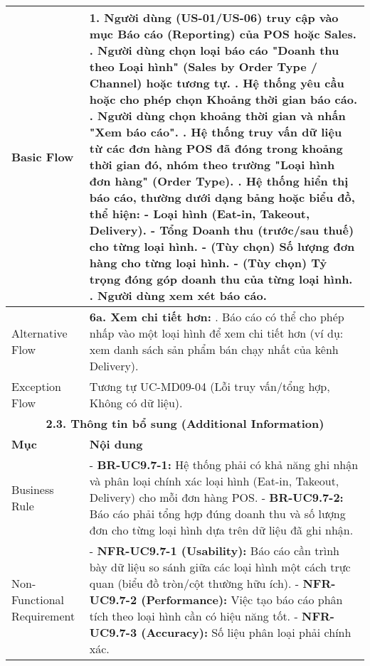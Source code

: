 \begin{longtable}{|m{4cm}|p{11cm}|}
\hline
Basic Flow & 1. Người dùng (US-01/US-06) truy cập vào mục Báo cáo (Reporting) của POS hoặc Sales. \newline 2. Người dùng chọn loại báo cáo "Doanh thu theo Loại hình" (Sales by Order Type / Channel) hoặc tương tự. \newline 3. Hệ thống yêu cầu hoặc cho phép chọn Khoảng thời gian báo cáo. \newline 4. Người dùng chọn khoảng thời gian và nhấn "Xem báo cáo". \newline 5. Hệ thống truy vấn dữ liệu từ các đơn hàng POS đã đóng trong khoảng thời gian đó, nhóm theo trường "Loại hình đơn hàng" (Order Type). \newline 6. Hệ thống hiển thị báo cáo, thường dưới dạng bảng hoặc biểu đồ, thể hiện: \newline    - Loại hình (Eat-in, Takeout, Delivery). \newline    - Tổng Doanh thu (trước/sau thuế) cho từng loại hình. \newline    - (Tùy chọn) Số lượng đơn hàng cho từng loại hình. \newline    - (Tùy chọn) Tỷ trọng đóng góp doanh thu của từng loại hình. \newline 7. Người dùng xem xét báo cáo. \\
\hline
Alternative Flow & \textbf{6a. Xem chi tiết hơn:} \newline    1. Báo cáo có thể cho phép nhấp vào một loại hình để xem chi tiết hơn (ví dụ: xem danh sách sản phẩm bán chạy nhất của kênh Delivery). \\
\hline
Exception Flow & Tương tự UC-MD09-04 (Lỗi truy vấn/tổng hợp, Không có dữ liệu). \\
\hline
\multicolumn{2}{|c|}{\textbf{2.3. Thông tin bổ sung (Additional Information)}} \\
\hline
\textbf{Mục} & \textbf{Nội dung} \\
\hline
Business Rule & - \textbf{BR-UC9.7-1:} Hệ thống phải có khả năng ghi nhận và phân loại chính xác loại hình (Eat-in, Takeout, Delivery) cho mỗi đơn hàng POS. \newline - \textbf{BR-UC9.7-2:} Báo cáo phải tổng hợp đúng doanh thu và số lượng đơn cho từng loại hình dựa trên dữ liệu đã ghi nhận. \\
\hline
Non-Functional Requirement & - \textbf{NFR-UC9.7-1 (Usability):} Báo cáo cần trình bày dữ liệu so sánh giữa các loại hình một cách trực quan (biểu đồ tròn/cột thường hữu ích). \newline - \textbf{NFR-UC9.7-2 (Performance):} Việc tạo báo cáo phân tích theo loại hình cần có hiệu năng tốt. \newline - \textbf{NFR-UC9.7-3 (Accuracy):} Số liệu phân loại phải chính xác. \\
\hline
\end{longtable}

